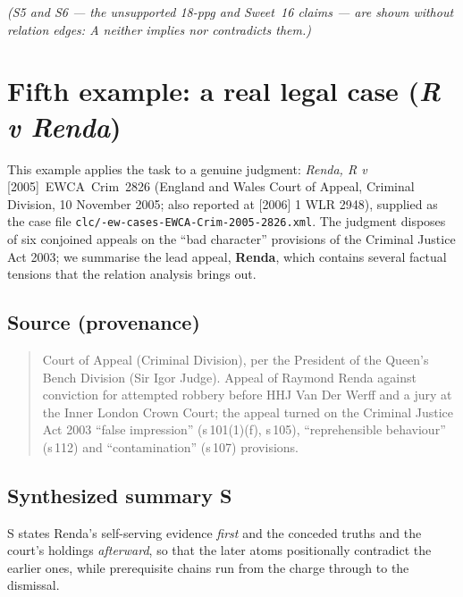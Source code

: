 \documentclass[11pt]{article}
\begin{document}
\noindent\emph{(S5 and S6 --- the unsupported 18-ppg and Sweet~16 claims --- are
shown without relation edges: A neither implies nor contradicts them.)}

\section{Fifth example: a real legal case (\emph{R v Renda})}

This example applies the task to a genuine judgment: \emph{Renda, R v}
\mbox{[2005] EWCA Crim 2826} (England and Wales Court of Appeal, Criminal
Division, 10 November 2005; also reported at [2006] 1 WLR 2948), supplied as the
case file \texttt{clc/-ew-cases-EWCA-Crim-2005-2826.xml}. The judgment disposes
of six conjoined appeals on the ``bad character'' provisions of the Criminal
Justice Act 2003; we summarise the lead appeal, \textbf{Renda}, which contains
several factual tensions that the relation analysis brings out.

\subsection*{Source (provenance)}
\begin{quote}\small
Court of Appeal (Criminal Division), per the President of the Queen's Bench
Division (Sir Igor Judge). Appeal of Raymond Renda against conviction for
attempted robbery before HHJ Van Der Werff and a jury at the Inner London Crown
Court; the appeal turned on the Criminal Justice Act 2003 ``false impression''
(s\,101(1)(f), s\,105), ``reprehensible behaviour'' (s\,112) and
``contamination'' (s\,107) provisions.
\end{quote}

\subsection*{Synthesized summary S}

S states Renda's self-serving evidence \emph{first} and the conceded truths and
the court's holdings \emph{afterward}, so that the later atoms positionally
contradict the earlier ones, while prerequisite chains run from the charge
through to the dismissal.
\end{document}

